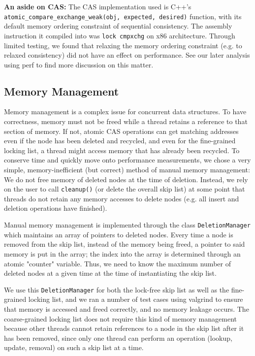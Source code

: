 \documentclass[11pt]{article}
\begin{document}
\textbf{An aside on CAS:} The CAS implementation used is C++'s  \texttt{atomic\_compare\_exchange\_weak(obj, expected, desired)} function, with its default memory ordering constraint of sequential consistency. The assembly instruction it compiled into was \texttt{lock cmpxchg} on x86 architecture. Through limited testing, we found that relaxing the memory ordering constraint (e.g. to relaxed consistency) did not have an effect on performance. See our later analysis using perf to find more discussion on this matter.

\subsection{Memory Management}
Memory management is a complex issue for concurrent data structures. To have correctness, memory must not be freed while a thread retains a reference to that section of memory. If not, atomic CAS operations can get matching addresses even if the node has been deleted and recycled, and even for the fine-grained locking list, a thread might access memory that has already been recycled. To conserve time and quickly move onto performance measurements, we chose a very simple, memory-inefficient (but correct) method of manual memory management: We do not free memory of deleted nodes at the time of deletion. Instead, we rely on the user to call \texttt{cleanup()} (or delete the overall skip list) at some point that threads do not retain any memory accesses to delete nodes (e.g. all insert and deletion operations have finished).

Manual memory management is implemented through the class \texttt{DeletionManager} which maintains an array of pointers to deleted nodes. Every time a node is removed from the skip list, instead of the memory being freed, a pointer to said memory is put in the array; the index into the array is determined through an atomic "counter" variable. Thus, we need to know the maximum number of deleted nodes at a given time at the time of instantiating the skip list.

We use this \texttt{DeletionManager} for both the lock-free skip list as well as the fine-grained locking list, and we ran a number of test cases using valgrind to ensure that memory is accessed and freed correctly, and no memory leakage occurs. The coarse-grained locking list does not require this kind of memory management because other threads cannot retain references to a node in the skip list after it has been removed, since only one thread can perform an operation (lookup, update, removal) on such a skip list at a time.
\pagebreak
\end{document}
